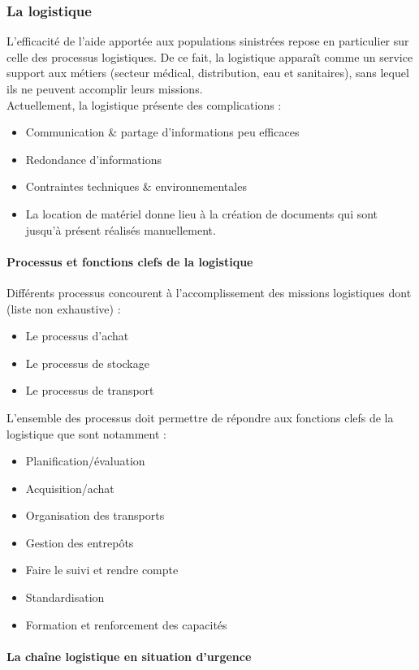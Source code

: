 \subsubsection{La logistique}
L'efficacité de l'aide apportée aux populations sinistrées repose en particulier sur celle des processus logistiques. De ce fait, la logistique apparaît comme un service support aux métiers (secteur médical, distribution, eau et sanitaires), sans lequel ils ne peuvent accomplir leurs missions.
\\
Actuellement, la logistique présente des complications :
\begin{itemize}
\item Communication \& partage d'informations peu efficaces
\item Redondance d'informations
\item Contraintes techniques \& environnementales
\item La location de matériel donne lieu à la création de documents qui sont jusqu'à présent réalisés manuellement.
\end{itemize}

\paragraph{Processus et fonctions clefs de la logistique}
Différents processus concourent à l'accomplissement des missions logistiques dont (liste non exhaustive) :
\begin{itemize}
\item Le processus d'achat
\item Le processus de stockage
\item Le processus de transport
\end{itemize}
L'ensemble des processus doit permettre de répondre aux fonctions clefs de la logistique que sont notamment :
\begin{itemize}
\item Planification/évaluation
\item Acquisition/achat
\item Organisation des transports
\item Gestion des entrepôts
\item Faire le suivi et rendre compte
\item Standardisation
\item Formation et renforcement des capacités
\end{itemize}

\paragraph{La chaîne logistique en situation d'urgence}

